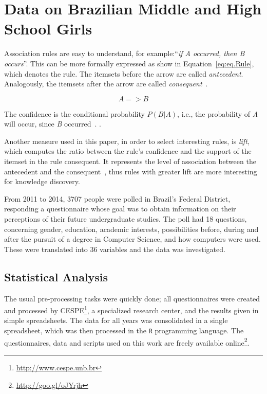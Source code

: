 \section{Data on Brazilian Middle and High School Girls}\label{sec:mining}%
Association rules are easy to understand, for example:``\emph{if A occurred, then B occurs}''. This can be more formally expressed as show in Equation~\ref{eq:eq.Rule}, which denotes the rule. The itemsets before the arrow are called \emph{antecedent}. Analogously, the itemsets after the arrow are called \emph{consequent}~\cite{Hastie2009}.

\begin{equation}
{A} => {B}
\label{eq:eq.Rule}%
\end{equation}

The confidence is the conditional probability $P(B|A)$, i.e., the probability of \emph{A} will occur, since \emph{B} occurred~\cite{Hastie2009}. .

Another measure used in this paper, in order to select interesting rules, is \emph{lift}, which computes the ratio between the rule's confidence and the support of the itemset in the rule consequent. It represents the level of association between the antecedent and the consequent~\cite{tan2006introduction}, thus rules with greater lift are more interesting for knowledge discovery.

From 2011 to 2014, 3707 people were polled in Brazil's Federal District, responding a questionnaire whose goal was to obtain information on their perceptions of their future undergraduate studies. The poll had 18 questions, concerning gender, education, academic interests, possibilities before, during and after the pursuit of a degree in Computer Science, and how computers were used. These were translated into 36 variables and the data was investigated.

\subsection{Statistical Analysis}\label{sec:mining:stat}%
The usual pre-processing tasks were quickly done; all questionnaires were created and processed by CESPE\footnote{\url{http://www.cespe.unb.br}}, a specialized research center, and the results given in simple spreadsheets. The data for all years was consolidated in a single spreadsheet, which was then processed in the \texttt{R} programming language. The questionnaires, data and scripts used on this work are freely available online\footnote{\url{http://goo.gl/oJYrjh}}.


